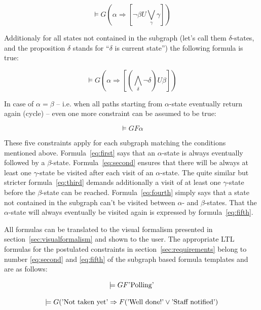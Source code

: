 \documentclass[conference]{IEEEtran}
\begin{document}
\begin{equation} \label{eq:third}
  \models G (\alpha \Rightarrow [\neg \beta U \bigvee_{\gamma} \gamma])
\end{equation}

Additionaly for all states not contained in the subgraph (let's call them $\delta$-states, and the proposition $\delta$ stands for ``$\delta$ is current state'') the following formula is true: 

\begin{equation} \label{eq:fourth}
  \models G (\alpha \Rightarrow [(\bigwedge_{\delta} \neg \delta) U \beta])
\end{equation}

In case of $\alpha = \beta$ -- i.e. when all paths starting from $\alpha$-state eventually return again (cycle) -- even one more constraint can be assumed to be true:

\begin{equation} \label{eq:fifth}
  \models G F \alpha
\end{equation}
 

These five constraints apply for each subgraph matching the conditions mentioned above. Formula~\ref{eq:first} says that an $\alpha$-state is always eventually followed by a $\beta$-state. Formula~\ref{eq:second} ensures that there will be always at least one $\gamma$-state be visited after each visit of an $\alpha$-state. The quite similar but stricter formula~\ref{eq:third} demands additionally a visit of at least one $\gamma$-state before the $\beta$-state can be reached. Formula~\ref{eq:fourth} simply says that a state not contained in the subgraph can't be visited between $\alpha$- and $\beta$-states. That the $\alpha$-state will always eventually be visited again is expressed by formula~\ref{eq:fifth}.

All formulas can be translated to the visual formalism presented in section~\ref{sec:visualformalism} and shown to the user. The appropriate LTL formulas for the postulated constraints in section~\ref{sec:requirements} belong to number \ref{eq:second} and \ref{eq:fifth} of the subgraph based formula templates and are as follows:

\begin{equation}
  \models G F \textnormal{'Polling'}
\end{equation}

\begin{equation}
	\models G (\textnormal{'Not taken yet'} \Rightarrow F (\textnormal{'Well done!'} \vee \textnormal{'Staff notified'})
\end{equation}
\end{document}

